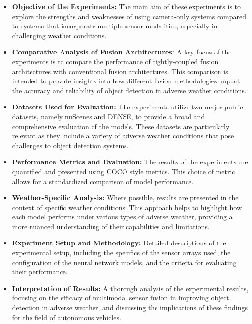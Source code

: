 \documentclass[report.tex]{subfiles}
\begin{document}
    \begin{itemize}
        \item \textbf{Objective of the Experiments:} The main aim of these experiments is to explore the strengths and weaknesses of using camera-only systems compared to systems that incorporate multiple sensor modalities, especially in challenging weather conditions.

        \item \textbf{Comparative Analysis of Fusion Architectures:} A key focus of the experiments is to compare the performance of tightly-coupled fusion architectures with conventional fusion architectures. This comparison is intended to provide insights into how different fusion methodologies impact the accuracy and reliability of object detection in adverse weather conditions.

        \item \textbf{Datasets Used for Evaluation:} The experiments utilize two major public datasets, namely nuScenes and DENSE, to provide a broad and comprehensive evaluation of the models. These datasets are particularly relevant as they include a variety of adverse weather conditions that pose challenges to object detection systems.

        \item \textbf{Performance Metrics and Evaluation:} The results of the experiments are quantified and presented using COCO style metrics. This choice of metric allows for a standardized comparison of model performance.

        \item \textbf{Weather-Specific Analysis:} Where possible, results are presented in the context of specific weather conditions. This approach helps to highlight how each model performs under various types of adverse weather, providing a more nuanced understanding of their capabilities and limitations.

        \item \textbf{Experiment Setup and Methodology:} Detailed descriptions of the experimental setup, including the specifics of the sensor arrays used, the configuration of the neural network models, and the criteria for evaluating their performance.

        \item \textbf{Interpretation of Results:} A thorough analysis of the experimental results, focusing on the efficacy of multimodal sensor fusion in improving object detection in adverse weather, and discussing the implications of these findings for the field of autonomous vehicles.
    \end{itemize}
\end{document}
